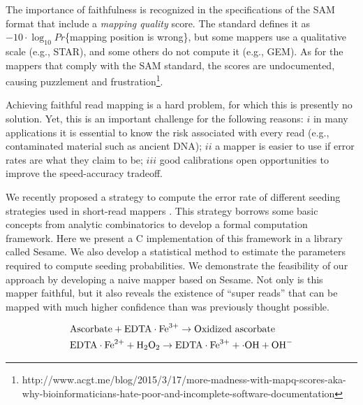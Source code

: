 \documentclass[a4,center,fleqn]{NAR}
\begin{document}
The importance of faithfulness is recognized in the specifications of the
SAM format \cite{1} that include a \emph{mapping quality} score. The
standard defines it as $-10 \cdot \log_{10}Pr$\{mapping position is
wrong\}, but some mappers use a qualitative scale (e.g., STAR), and
some others do not compute it (e.g., GEM). As for the mappers that comply
with the SAM standard, the scores are undocumented, causing
puzzlement and frustration\footnote{http://www.acgt.me/blog/2015/3/17/more-madness-with-mapq-scores-aka-why-bioinformaticians-hate-poor-and-incomplete-software-documentation}.

Achieving faithful read mapping is a hard problem, for which this is
presently no solution. Yet, this is an important challenge for the
following reasons:
$i$ in many applications it is essential to know the risk associated with
every read (e.g., contaminated material such as ancient DNA);
$ii$ a mapper is easier to use if error rates are what they claim to
be;
$iii$ good calibrations open opportunities to improve the speed-accuracy
tradeoff.

We recently proposed a strategy to compute the error rate of different
seeding strategies used in short-read mappers \cite{1}. This strategy
borrows some basic concepts from analytic combinatorics \cite{1} to
develop a formal computation framework. Here we present a C implementation
of this framework in a library called Sesame. We also develop a
statistical method to estimate the parameters required to compute seeding
probabilities. We demonstrate the feasibility of our approach by
developing a naive mapper based on Sesame. Not only is this mapper
faithful, but it also reveals the existence of ``super reads'' that can be
mapped with much higher confidence than was previously thought possible.

\begin{align*}
&\mathrm{Ascorbate} + \mathrm{EDTA} \cdot \mathrm{Fe}^{3+} \to
\hbox{Oxidized ascorbate}
\\
&\mathrm{EDTA} \cdot \mathrm{Fe}^{2+} + \mathrm{H}_2
\mathrm{O}_2 \to
\mathrm{EDTA} \cdot \mathrm{Fe}^{3+} + \cdot
\mathrm{OH} + \mathrm{OH}^-
\end{align*}

\enlargethispage{-65.1pt}
\end{document}
